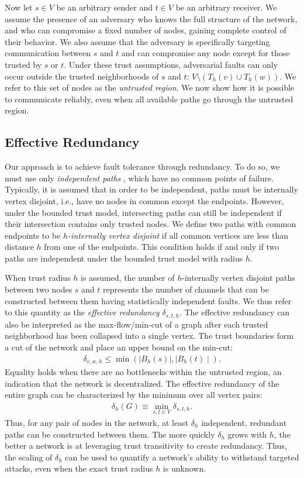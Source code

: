 \documentclass[10pt,letterpaper]{article}
\newcommand{\beq}{\begin{eqnarray}}
\newcommand{\eeq}{\end{eqnarray}}
\begin{document}
Now let $s \in V$ be an arbitrary sender
and $t \in V$ be an arbitrary receiver.
We assume the presence of an adversary who knows the
full structure of the network,
and who can compromise a fixed number of nodes,
gaining complete control of their behavior.
We also assume that the adversary is specifically targeting communication
between $s$ and $t$ and
can compromise any node except for those trusted by $s$ or $t$.
Under these trust assumptions, adversarial faults can only occur
outside the trusted neighborhoods of $s$ and $t$:
$V \setminus \left(T_h(v) \cup T_h(w)\right)$.
We refer to this set of nodes as the {\em untrusted region}.
We now show how it is possible to communicate reliably,
even when all available paths go through the untrusted region.

\subsection*{Effective Redundancy}

Our approach is to achieve fault tolerance through redundancy.
To do so, we must use only
{\em independent paths} \cite{reiter_resilient_1998},
which have no common points of failure.
Typically, it is assumed that in order to be independent,
paths must be internally vertex disjoint, i.e.,
have no nodes in common except the endpoints.
However, under the bounded trust model,
intersecting paths can still be independent if their
intersection contains only trusted nodes.
We define two paths with common endpoints
to be {\em $h$-internally vertex disjoint}
if all common vertices are less than distance $h$ from
one of the endpoints.
This condition holds if and only if two paths are independent
under the bounded trust model with radius $h$.

When trust radius $h$ is assumed,
the number of $h$-internally vertex disjoint paths between
two nodes $s$ and $t$ represents the number of
channels that can be constructed between them having
statistically independent faults.
We thus refer to this quantity as the 
{\em effective redundancy} $\delta_{s,t,h}$.
The effective redundancy can also be interpreted as the
max-flow/min-cut of a graph after each trusted neighborhood has been
collapsed into a single vertex.
The trust boundaries form a cut of the network and place an upper bound on the
min-cut:
\beq
\delta_{v,w,h} \leq \min\left( \mid B_h(s) \mid, \mid B_h(t) \mid \right).
\eeq
Equality holds when there are no bottlenecks within the untrusted region,
an indication that the network is decentralized.
The effective redundancy of the entire graph can be characterized by the minimum
over all vertex pairs:
\beq
\delta_h(G) \equiv \min_{s,t \in V} \delta_{s,t,h}.
\eeq
Thus, for any pair of nodes in the network, at least $\delta_h$ independent,
redundant paths can be constructed between them.
The more quickly $\delta_h$ grows with $h$,
the better a network is at leveraging trust transitivity to create redundancy.
Thus, the scaling of $\delta_h$ can be used to quantify a network's ability
to withstand targeted attacks,
even when the exact trust radius $h$ is unknown.
\end{document}
